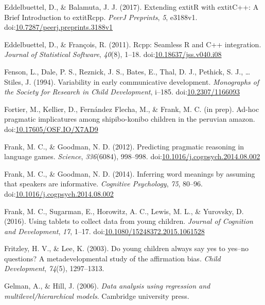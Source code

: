 \documentclass[mask,man]{apa6}
\begin{document}
\hypertarget{ref-R-Rcpp_b}{}
Eddelbuettel, D., \& Balamuta, J. J. (2017). Extending extitR with
extitC++: A Brief Introduction to extitRcpp. \emph{PeerJ Preprints},
\emph{5}, e3188v1.
doi:\href{https://doi.org/10.7287/peerj.preprints.3188v1}{10.7287/peerj.preprints.3188v1}

\hypertarget{ref-R-Rcpp_a}{}
Eddelbuettel, D., \& François, R. (2011). Rcpp: Seamless R and C++
integration. \emph{Journal of Statistical Software}, \emph{40}(8),
1--18.
doi:\href{https://doi.org/10.18637/jss.v040.i08}{10.18637/jss.v040.i08}

\hypertarget{ref-fenson1994}{}
Fenson, L., Dale, P. S., Reznick, J. S., Bates, E., Thal, D. J.,
Pethick, S. J., \ldots{} Stiles, J. (1994). Variability in early
communicative development. \emph{Monographs of the Society for Research
in Child Development}, i--185.
doi:\href{https://doi.org/10.2307/1166093}{10.2307/1166093}

\hypertarget{ref-fortierunderrev}{}
Fortier, M., Kellier, D., Fernández Flecha, M., \& Frank, M. C. (in
prep). Ad-hoc pragmatic implicatures among shipibo-konibo children in
the peruvian amazon.
doi:\href{https://doi.org/10.17605/OSF.IO/X7AD9}{10.17605/OSF.IO/X7AD9}

\hypertarget{ref-frank2012}{}
Frank, M. C., \& Goodman, N. D. (2012). Predicting pragmatic reasoning
in language games. \emph{Science}, \emph{336}(6084), 998--998.
doi:\href{https://doi.org/10.1016/j.cogpsych.2014.08.002}{10.1016/j.cogpsych.2014.08.002}

\hypertarget{ref-frank2014}{}
Frank, M. C., \& Goodman, N. D. (2014). Inferring word meanings by
assuming that speakers are informative. \emph{Cognitive Psychology},
\emph{75}, 80--96.
doi:\href{https://doi.org/10.1016/j.cogpsych.2014.08.002}{10.1016/j.cogpsych.2014.08.002}

\hypertarget{ref-frank2016}{}
Frank, M. C., Sugarman, E., Horowitz, A. C., Lewis, M. L., \& Yurovsky,
D. (2016). Using tablets to collect data from young children.
\emph{Journal of Cognition and Development}, \emph{17}, 1--17.
doi:\href{https://doi.org/10.1080/15248372.2015.1061528}{10.1080/15248372.2015.1061528}

\hypertarget{ref-fritzley2003young}{}
Fritzley, H. V., \& Lee, K. (2003). Do young children always say yes to
yes--no questions? A metadevelopmental study of the affirmation bias.
\emph{Child Development}, \emph{74}(5), 1297--1313.

\hypertarget{ref-gelman2006data}{}
Gelman, A., \& Hill, J. (2006). \emph{Data analysis using regression and
multilevel/hierarchical models}. Cambridge university press.
\end{document}

